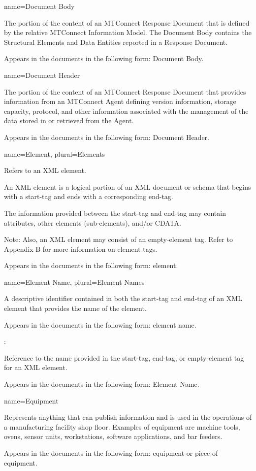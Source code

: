 {
  name={Document Body}
}
{
	The portion of the content of an MTConnect Response Document that is defined by the relative MTConnect Information Model. The Document Body contains the Structural Elements and Data Entities reported in a Response Document.

	Appears in the documents in the following form: Document Body.
}


{
  name={Document Header}
}
{
	The portion of the content of an MTConnect Response Document that provides information from an MTConnect Agent defining version information, storage capacity, protocol, and other information associated with the management of the data stored in or retrieved from the Agent.
	
	Appears in the documents in the following form: Document Header.
}


{
  name={Element},
  plural={Elements}
}
{
	Refers to an XML element.

	An XML element is a logical portion of an XML document or schema that begins with a start-tag and ends with a corresponding end-tag.  

	The information provided between the start-tag and end-tag may contain attributes, other elements (sub-elements), and/or CDATA.

	Note:  Also, an XML element may consist of an empty-element tag.  Refer to Appendix B for more information on element tags.

	Appears in the documents in the following form: element.
}


{
  name={Element Name},
  plural={Element Names}
}
{
	A descriptive identifier contained in both the start-tag and end-tag of an XML element that provides the name of the element.

	Appears in the documents in the following form: element name.

	:

	Reference to the name provided in the start-tag, end-tag, or empty-element tag for an XML element.

	Appears in the documents in the following form: Element Name.
}


{
  name={Equipment}
}
{
	Represents anything that can publish information and is used in the operations of a manufacturing facility shop floor.  Examples of equipment are machine tools, ovens, sensor units, workstations, software applications, and bar feeders.

	Appears in the documents in the following form: equipment or piece of equipment.
}


